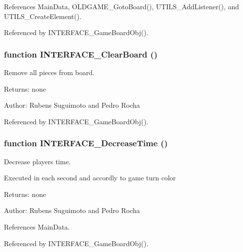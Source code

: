 References MainData, OLDGAME\_\-GotoBoard(), UTILS\_\-AddListener(), and UTILS\_\-CreateElement().

Referenced by INTERFACE\_\-GameBoardObj().
\subsubsection[INTERFACE\_\-ClearBoard]{\setlength{\rightskip}{0pt plus 5cm}function INTERFACE\_\-ClearBoard ()}\label{interface_2game_8js_1e1ba520dbd03800203aca5900c816a5}


Remove all pieces from board. 

\begin{Desc}
\item[Returns:]none \end{Desc}
\begin{Desc}
\item[Author:]Rubens Suguimoto and Pedro Rocha \end{Desc}


Referenced by INTERFACE\_\-GameBoardObj().
\subsubsection[INTERFACE\_\-DecreaseTime]{\setlength{\rightskip}{0pt plus 5cm}function INTERFACE\_\-DecreaseTime ()}\label{interface_2game_8js_dd4b7e45bdc5dd4143f9b9160933e826}


Decrease players time. 

Executed in each second and accordly to game turn color

\begin{Desc}
\item[Returns:]none \end{Desc}
\begin{Desc}
\item[Author:]Rubens Suguimoto and Pedro Rocha \end{Desc}


References MainData.

Referenced by INTERFACE\_\-GameBoardObj().

